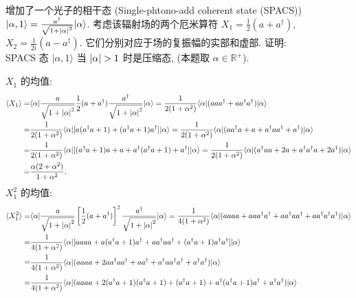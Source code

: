 \documentclass{assignment}
\begin{document}
\begin{prob}[20 分]
    增加了一个光子的相干态 (Single-phtono-add coherent state (SPACS)) $\lvert\alpha,1\rangle=\frac{a^{\dagger}}{\sqrt{1+\left\lvert\alpha\right\rvert^2}}\lvert\alpha\rangle$. 考虑该辐射场的两个厄米算符 $X_1=\frac{1}{2}(a+a^{\dagger})$, $X_2=\frac{1}{2i}(a-a^{\dagger})$. 它们分别对应于场的复振幅的实部和虚部. 证明:\\
    SPACS 态 $\lvert\alpha,1\rangle$ 当 $\left\lvert\alpha\right\rvert>1$ 时是压缩态, (本题取 $\alpha\in\mathbb{R}^+$).
\end{prob}
\begin{pf}
    $X_1$ 的均值:
    \begin{align}
        \notag\langle X_1\rangle=&\langle\alpha\rvert\frac{a}{\sqrt{1+\left\lvert\alpha\right\rvert^2}}\frac{1}{2}(a+a^{\dagger})\frac{a^{\dagger}}{\sqrt{1+\left\lvert\alpha\right\rvert^2}}\lvert\alpha\rangle=\frac{1}{2(1+\alpha^2)}\langle\alpha\rvert(aaa^{\dagger}+aa^{\dagger}a^{\dagger})\lvert\alpha\rangle\\
        \notag=&\frac{1}{2(1+\alpha^2)}\langle\alpha\rvert[a(a^{\dagger}a+1)+(a^{\dagger}a+1)a^{\dagger}]\lvert\alpha\rangle=\frac{1}{2(1+\alpha^2)}\langle\alpha\rvert(aa^{\dagger}a+a+a^{\dagger}aa^{\dagger}+a^{\dagger})\lvert\alpha\rangle\\
        \notag=&\frac{1}{2(1+\alpha^2)}\langle\alpha\rvert[(a^{\dagger}a+1)a+a+a^{\dagger}(a^{\dagger}a+1)+a^{\dagger}]\lvert\alpha\rangle=\frac{1}{2(1+\alpha^2)}\langle\alpha\rvert(a^{\dagger}aa+2a+a^{\dagger}a^{\dagger}a+2a^{\dagger})\lvert\alpha\rangle\\
        =&\frac{\alpha(2+\alpha^2)}{1+\alpha^2}.
    \end{align}
    $X_1^2$ 的均值:
    \begin{align}
        \notag\langle X_1^2\rangle=&\langle\alpha\rvert\frac{a}{\sqrt{1+\abs{\alpha}^2}}\left[\frac{1}{2}(a+a^{\dagger})\right]^2\frac{a^{\dagger}}{\sqrt{1+\abs{\alpha}^2}}\lvert\alpha\rangle=\frac{1}{4(1+\alpha^2)}\langle\alpha\rvert(aaaa+aaa^{\dagger}a^{\dagger}+aa^{\dagger}aa^{\dagger}+aa^{\dagger}a^{\dagger}a^{\dagger})\lvert\alpha\rangle\\
        \notag=&\frac{1}{4(1+\alpha^2)}\langle\alpha\rvert[aaaa+a(a^{\dagger}a+1)a^{\dagger}+aa^{\dagger}aa^{\dagger}+(a^{\dagger}a+1)a^{\dagger}a^{\dagger}]\lvert\alpha\rangle\\
        \notag=&\frac{1}{4(1+\alpha^2)}\langle\alpha\rvert(aaaa+2aa^{\dagger}aa^{\dagger}+aa^{\dagger}+a^{\dagger}aa^{\dagger}a^{\dagger}+a^{\dagger}a^{\dagger})\lvert\alpha\rangle\\
        \notag=&\frac{1}{4(1+\alpha^2)}\langle\alpha\rvert(aaaa+2(a^{\dagger}a+1)(a^{\dagger}a+1)+(a^{\dagger}a+1)+a^{\dagger}(a^{\dagger}a+1)a^{\dagger}+a^{\dagger}a^{\dagger})\lvert\alpha\rangle\\

\end{align}
\end{pf}
\end{document}
